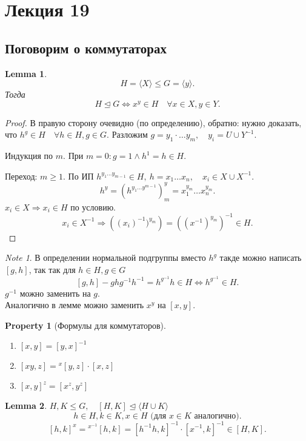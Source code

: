 \documentclass[11pt]{book}
\theoremstyle{definition}
\theoremstyle{plain}
\theoremstyle{plain}
\newtheorem*{lm}{Lemma}
\newtheorem*{prop}{Property}
\theoremstyle{definition}
\theoremstyle{remark}
\newtheorem*{note}{Note}
\begin{document}
\section{Лекция 19}
\subsection{Поговорим о коммутаторах}
\begin{lm}
    \[
	H = \langle X \rangle \le  G = \langle y \rangle
    .\] 
    Тогда \[
    H \trianglelefteq G \Longleftrightarrow x ^y \in H \quad \forall x \in  X, y \in  Y
    .\] 
\end{lm}
\begin{proof}
    В правую сторону очевидно (по определению), обратно: нужно доказать, что $h^g \in  H \quad \forall h \in  H, g \in G$. Разложим $g = y_1 \cdot \ldots y_m, \quad y_i = U \cup Y^{-1}$. 

    Индукция по $m$. При $m = 0: g=1 \wedge h^1 = h \in  H$.

    Переход: $m \ge 1$. По ИП $h^{y_1 \ldots y_{m-1}} \in  H, ~ h = x_1 \ldots x_n, \quad x_i \in  X \cup X^{-1}$.
	\[
	    h^y = (h^{y_1 \ldots y^{m-1}})^y_m = x_1^{y_m} \ldots x_n^{y_m}	
	.\] 
	$x_i \in X \Rightarrow  x_i \in  H$ по условию.
	\[
	x_i \in  X^{-1} \Rightarrow \left ((x_i)^{-1} )^{y_m} \right ) = \left ( (x^{-1})^{y_m} \right ) ^{-1} \in  H
	.\] 
\end{proof}
\begin{note}
    В определении нормальной подгруппы вместо $h^g$ такде можно написать $[g, h]$, так так для $h \in H, g \in  G$
     \[
	 [g, h] - ghg^{-1}h^{-1} = h^{g^{-1}} h \in  H \Longleftrightarrow h^{g^{-1}} \in  H 
    .\] 
    $g^{-1} $ можно заменить на $g$.\\
    Аналогично в лемме можно заменить $x^y$ на $[x, y]$. 
\end{note}

\begin{prop}[Формулы для коммутаторов]
    \begin{enumerate}
	\item $[x, y] = [y, x]^{-1}$
	\item $[xy, z] = \!^x[y, z] \cdot [x, z]$
	\item  $[x, y]^z = [x^z, y^z]$
    \end{enumerate}
\end{prop}
\begin{lm}
    $H, K \le G, \quad [H, K] \trianglelefteq \langle H \cup K \rangle$\\
    \[
	h \in  H, k \in  K, x \in  H \mbox{ (для $x \in  K$ аналогично)} 
    .\] 
    \[
	[h, k]^x = \!^{x^{-1}}[h, k] = [h^{-1} h, k]^{-1}\cdot [x^{-1}, k]^{-1} \in  [H, K]
    .\] 
\end{lm}
\end{document}

